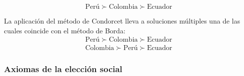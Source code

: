 \documentclass[a5paper,doc,10pt,noapacite]{apa6}
\begin{document}
{{\begin{figure}[H]
\centering
\begin{floatrow}
	\fontsize{7}{11}\selectfont
	\captionsetup{justification=centering, labelfont=footnotesize, font=footnotesize}
\end{floatrow}
\end{figure}

\vspace{-1\baselineskip}
\[
	\text{Perú} \succ \text{Colombia} \succ \text{Ecuador}
\]

La aplicación del método de Condorcet lleva a soluciones múltiples una de las cuales coincide con el método de Borda:
\begin{align*}
	\text{Perú} \succ \text{Colombia} \succ \text{Ecuador}
\\
	\text{Colombia} \succ \text{Perú} \succ \text{Ecuador}
\end{align*}

\subsubsection{Axiomas de la elección social}

}}
\end{document}
